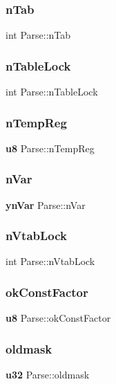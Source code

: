 \subsubsection{nTab}
{\footnotesize\ttfamily int Parse\+::n\+Tab}

\mbox{\label{struct_parse_a8c61b1b13dcb394b190fa09f5c253928}} 
\subsubsection{nTableLock}
{\footnotesize\ttfamily int Parse\+::n\+Table\+Lock}

\mbox{\label{struct_parse_ae292001c732781b6b94d28ca303e1aa5}} 
\subsubsection{nTempReg}
{\footnotesize\ttfamily \textbf{ u8} Parse\+::n\+Temp\+Reg}

\mbox{\label{struct_parse_ae529f84d792c36e3f474e2ff89f0b6e4}} 
\subsubsection{nVar}
{\footnotesize\ttfamily \textbf{ yn\+Var} Parse\+::n\+Var}

\mbox{\label{struct_parse_a7db8fe1ce2f0ec6bda7dc729a0e6a6e3}} 
\subsubsection{nVtabLock}
{\footnotesize\ttfamily int Parse\+::n\+Vtab\+Lock}

\mbox{\label{struct_parse_ad9f3adb62af32e4fa5fe0c0d8621ae7b}} 
\subsubsection{okConstFactor}
{\footnotesize\ttfamily \textbf{ u8} Parse\+::ok\+Const\+Factor}

\mbox{\label{struct_parse_acda3334b932ac6541f45fa939053e942}} 
\subsubsection{oldmask}
{\footnotesize\ttfamily \textbf{ u32} Parse\+::oldmask}


